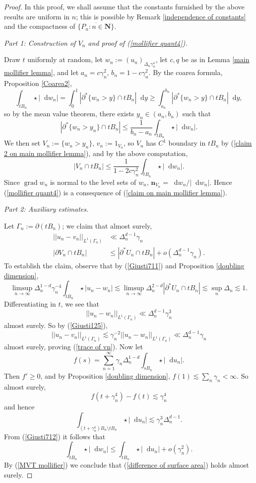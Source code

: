 \documentclass[reqno,10pt]{amsart}
\newcommand{\NN}{\mathbf{N}}
\newcommand*\dif{\mathop{}\!\mathrm{d}}
\DeclareMathOperator{\grad}{grad}
\newcommand{\normal}{\mathbf n}
\theoremstyle{definition}
\newcommand{\proofpart}[2]{%
  \par
  \addvspace{\medskipamount}%
  \noindent\emph{Part #1: #2.}
}
\numberwithin{equation}{section}
\begin{document}
\begin{proof}
In this proof, we shall assume that the constants furnished by the above results are uniform in $n$; this is possible by Remark \ref{independence of constants} and the compactness of $\overline{\{P_n: n \in \NN\}}$.

\proofpart{1}{Construction of $V_n$ and proof of (\ref{mollifier quant4})}
Draw $t$ uniformly at random, let $w_n := (u_n)_{\Delta_n \gamma_n^4}$, let $c, q$ be as in Lemma \ref{main mollifier lemma}, and let $a_n = c\gamma_n^2$, $b_n = 1 - c\gamma_n^2$.
By the coarea formula, Proposition \ref{Coarea2},
$$\int_{tB_n} \star |\dif w_n| = \int_0^1 |\partial^* \{w_n > y\} \cap tB_n| \dif y \geq \int_{a_n}^{b_n} |\partial^* \{w_n > y\} \cap tB_n| \dif y,$$
so by the mean value theorem, there exists $y_n \in (a_n, b_n)$ such that
$$|\partial^* \{w_n > y_n\} \cap tB_n| \leq \frac{1}{b_n - a_n} \int_{tB_n} \star |\dif w_n|.$$
We then set $V_n := \{w_n > y_n\}$, $v_n := 1_{V_n}$, so $V_n$ has $C^1$ boundary in $tB_n$ by (\ref{claim 2 on main mollifier lemma}), and by the above computation,
\begin{equation}\label{MVT mollifier}
|V_n \cap tB_n| \leq \frac{1}{1 - 2c\gamma_n^2} \int_{tB_n} \star |\dif w_n|.
\end{equation}
Since $\grad w_n$ is normal to the level sets of $w_n$, $\normal_{V_n} = \dif w_n/|\dif w_n|$.
Hence (\ref{mollifier quant4}) is a consequence of (\ref{claim on main mollifier lemma}).

\proofpart{2}{Auxiliary estimates}
Let $\Gamma_n := \partial(tB_n)$; we claim that almost surely,
\begin{align}
||u_n - v_n||_{L^1(\Gamma_n)} &\ll \Delta_n^{d - 1} \gamma_n \label{trace of vn} \\
|\partial V_n \cap tB_n| &\leq |\partial^* U_n \cap tB_n| + o(\Delta_n^{d - 1} \gamma_n). \label{difference of surface area}
\end{align}
To establish the claim, observe that by (\ref{Giusti711}) and Proposition \ref{doubling dimension},
$$\limsup_{n \to \infty} \Delta_n^{1 - d} \gamma_n^{-4} \int_{tB_n} \star |u_n - w_n| \lesssim \limsup_{n \to \infty} \Delta_n^{2-d} |\partial^* U_n \cap tB_n| \lesssim \sup_n \Delta_n \lesssim 1.$$
Differentiating in $t$, we see that
$$||u_n - w_n||_{L^1(\Gamma_n)} \ll \Delta_n^{d - 1} \gamma_n^3$$
almost surely. So by (\ref{Giusti125}),
$$||u_n - v_n||_{L^1(\Gamma_n)} \lesssim \gamma_n^{-2} ||u_n - w_n||_{L^1(\Gamma_n)} \ll \Delta_n^{d - 1} \gamma_n$$
almost surely, proving (\ref{trace of vn}).
Now let
$$f(s) = \sum_{n=1}^\infty \gamma_n \Delta_n^{1 - d} \int_{sB_n} \star |\dif u_n|.$$
Then $f' \geq 0$, and by Proposition \ref{doubling dimension}, $f(1) \lesssim \sum_n \gamma_n < \infty$.
So almost surely,
$$f(t + \gamma_n^4) - f(t) \lesssim \gamma_n^4$$
and hence
$$\int_{(t + \gamma_n^4)B_n \setminus tB_n} \star |\dif u_n| \lesssim \gamma_n^3 \Delta_n^{d - 1}.$$
From (\ref{Giusti712}) it follows that
$$\int_{tB_n} \star |\dif w_n| \leq \int_{tB_n} \star |\dif u_n| + o(\gamma_n^2).$$
By (\ref{MVT mollifier}) we conclude that (\ref{difference of surface area}) holds almost surely.


\end{proof}
\end{document}
